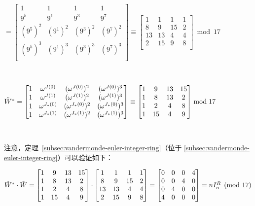 $ = \begin{bmatrix}
1 & 1 & 1 & 1\\
9^{5} & 9^{1} & 9^{3} & 9^{7}\\
(9^{5})^2 & (9^{1})^2 & (9^{3})^2 & (9^{7})^2\\
(9^{5})^3 & (9^{1})^3 & (9^{3})^3 & (9^{7})^3\\
\end{bmatrix} \equiv \begin{bmatrix}
1 & 1 & 1 & 1\\
8 & 9 & 15 & 2\\
13 & 13 & 4 & 4\\
2 & 15 & 9 & 8\\
\end{bmatrix} \bmod{17}$ 

$ $ 

$\tilde{W}^* = \begin{bmatrix}
1 & \omega^{J(0)} & (\omega^{J(0)})^2 & (\omega^{J(0)})^3\\
1 & \omega^{J(1)} & (\omega^{J(1)})^2 & (\omega^{J(1)})^3\\
1 & \omega^{J_*(0)} & (\omega^{J_*(0)})^2 & (\omega^{J_*(0)})^3\\
1 & \omega^{J_*(1)} & (\omega^{J_*(1)})^2 & (\omega^{J_*(1)})^3\\
\end{bmatrix} \equiv \begin{bmatrix}
1 & 9 & 13 & 15\\
1 & 8 & 13 & 2\\
1 & 2 & 4 & 8\\
1 & 15 & 4 & 9\\
\end{bmatrix}  \bmod{17}$

$ $

注意，定理~\ref*{subsec:vandermonde-euler-integer-ring}（位于 \autoref{subsec:vandermonde-euler-integer-ring}）可以验证如下：

$\tilde{W}^* \cdot \tilde{W} = \begin{bmatrix}
1 & 9 & 13 & 15\\
1 & 8 & 13 & 2\\
1 & 2 & 4 & 8\\
1 & 15 & 4 & 9\\
\end{bmatrix} \cdot \begin{bmatrix}
1 & 1 & 1 & 1\\
8 & 9 & 15 & 2\\
13 & 13 & 4 & 4\\
2 & 15 & 9 & 8\\
\end{bmatrix} = \begin{bmatrix}
0 & 0 & 0 & 4\\
0 & 0 & 4 & 0\\
0 & 4 & 0 & 0\\
4 & 0 & 0 & 0\\
\end{bmatrix} = n I_n^{R} \pmod{17}$

